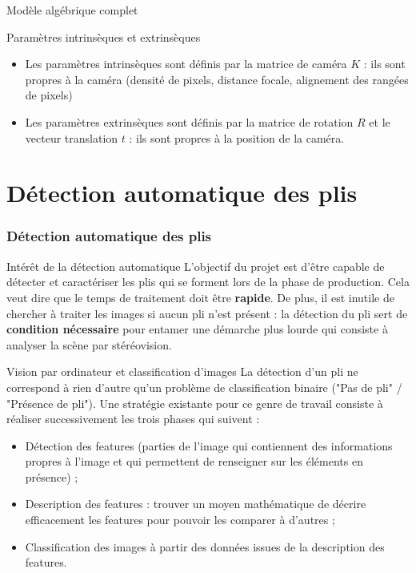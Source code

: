 \documentclass[8pt]{beamer}
\begin{document}
\begin{frame}{Modèle algébrique complet}
		\begin{block}{Paramètres intrinsèques et extrinsèques}
			\begin{itemize}
				\item Les paramètres intrinsèques sont définis par la matrice de caméra $K$ : ils sont propres à la caméra (densité de pixels, distance focale, alignement des rangées de pixels)
				\item Les paramètres extrinsèques sont définis par la matrice de rotation $R$ et le vecteur translation $t$ : ils sont propres à la position de la caméra.
			\end{itemize}
		\end{block}
	\end{frame}


\section*{Détection automatique des plis}
	\begin{frame}
		\frametitle{Détection automatique des plis}
		\begin{block}{Intérêt de la détection automatique}
			L'objectif du projet est d'être capable de détecter et caractériser les plis qui se forment lors de la phase de production. Cela veut dire que le temps de traitement doit être \textbf{rapide}. De plus, il est inutile de chercher à traiter les images si aucun pli n'est présent : la détection du pli sert de \textbf{condition nécessaire} pour entamer une démarche plus lourde qui consiste à analyser la scène par stéréovision.
		\end{block}
		\begin{block}{Vision par ordinateur et classification d'images}
			La détection d'un pli ne correspond à rien d'autre qu'un problème de classification binaire ("Pas de pli" / "Présence de pli"). Une stratégie existante pour ce genre de travail consiste à réaliser successivement les trois phases qui suivent :
			\begin{itemize}
				\item Détection des features (parties de l'image qui contiennent des informations propres à l'image et qui permettent de renseigner sur les éléments en présence) ;
				\item Description des features : trouver un moyen mathématique de décrire efficacement les features pour pouvoir les comparer à d'autres ;
				\item Classification des images à partir des données issues de la description des features.
			\end{itemize}
		\end{block}
	\end{frame}
\end{document}
